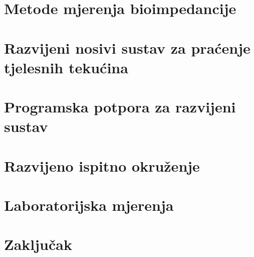 \documentclass[diplomskirad, numeric, utf8, times]{fer}
\begin{document}
\chapter{Metode mjerenja bioimpedancije}
\label{chap:bioz}



\chapter{Razvijeni nosivi sustav za praćenje tjelesnih tekućina}



\chapter{Programska potpora za razvijeni sustav}
\label{chap:programska_podrska}



\chapter{Razvijeno ispitno okruženje}



\chapter{Laboratorijska mjerenja}



\chapter{Zaključak}
\label{pog:zakljucak}





\nocite{*}

\end{document}
